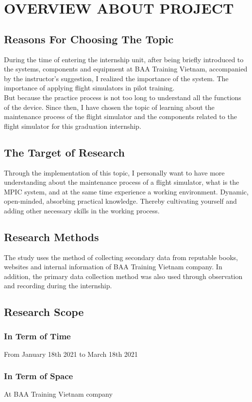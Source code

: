 \chapter{OVERVIEW ABOUT PROJECT}

\renewcommand{\headrulewidth}{0.5pt}
\renewcommand{\footrulewidth}{0.5pt}
\thispagestyle{plain}
\pagestyle{fancy}
\fancyhf{}
\raggedright
{}

\justifying

\section{Reasons For Choosing The Topic}
    During the time of entering the internship unit, after being briefly introduced to the systems, components and equipment 
    at BAA Training Vietnam, accompanied by the instructor's suggestion, I realized the importance of the system. The importance 
    of applying flight simulators in pilot training. \\ 
    \vspace{3mm}
    But because the practice process is not too long to understand all the functions of the device. Since then, I have chosen the 
    topic of learning about the maintenance process of the flight simulator and the components related to the flight simulator for 
    this graduation internship.

\section{The Target of Research}
    Through the implementation of this topic, I personally want to have more understanding about the maintenance process of a flight 
    simulator, what is the MPIC system, and at the same time experience a working environment. Dynamic, open-minded, absorbing practical 
    knowledge. Thereby cultivating yourself and adding other necessary skills in the working process.

\section{Research Methods}
    The study uses the method of collecting secondary data from reputable books, websites and internal information of BAA Training Vietnam 
    company. In addition, the primary data collection method was also used through observation and recording during the internship.

\section{Research Scope}
    \subsection{In Term of Time}
        From January 18th 2021 to March 18th 2021
    \subsection{In Term of Space}
        At BAA Training Vietnam company